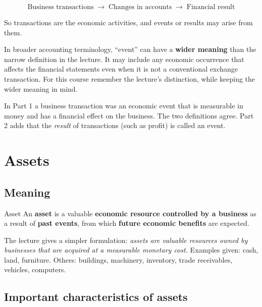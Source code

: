 \documentclass[11pt,a4paper]{article}
\begin{document}
\[
\text{Business transactions}\;\rightarrow\;\text{Changes in accounts}\;\rightarrow\;\text{Financial result}
\]

So transactions are the economic activities, and events or results may arise from them.

\begin{impbox}
In broader accounting terminology, ``event'' can have a \textbf{wider meaning} than the narrow definition
in the lecture. It may include any economic occurrence that affects the financial statements even when it
is not a conventional exchange transaction. For this course remember the lecture's distinction, while
keeping the wider meaning in mind.
\end{impbox}

\begin{notebox}
In Part 1 a business transaction was an economic event that is measurable in money and has a financial effect
on the business. The two definitions agree. Part 2 adds that the \emph{result} of transactions (such as profit)
is called an event.
\end{notebox}

\section{Assets}

\subsection{Meaning}

\begin{defbox}{Asset}
An \textbf{asset} is a valuable \textbf{economic resource controlled by a business} as a result of
\textbf{past events}, from which \textbf{future economic benefits} are expected.
\end{defbox}

The lecture gives a simpler formulation: \emph{assets are valuable resources owned by businesses that are
acquired at a measurable monetary cost.} Examples given: cash, land, furniture. Others: buildings, machinery,
inventory, trade receivables, vehicles, computers.

\subsection{Important characteristics of assets}
\end{document}
